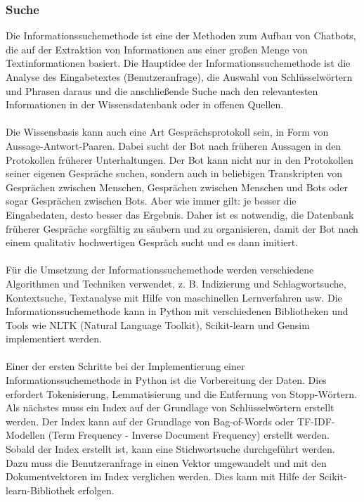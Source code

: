 \subsubsection{Suche}
Die Informationssuchemethode ist eine der Methoden zum Aufbau von Chatbots, die auf der Extraktion von Informationen aus einer großen Menge von Textinformationen basiert. 
Die Hauptidee der Informationssuchemethode ist die Analyse des Eingabetextes (Benutzeranfrage), die Auswahl von Schlüsselwörtern und Phrasen daraus und die anschließende Suche nach den relevantesten Informationen in der Wissensdatenbank oder in offenen Quellen.\\\\
Die Wissensbasis kann auch eine Art \glqq{}Gesprächsprotokoll\grqq{} sein, in Form von Aussage-Antwort-Paaren. 
Dabei sucht der Bot nach früheren Aussagen in den Protokollen früherer Unterhaltungen. 
Der Bot kann nicht nur in den Protokollen seiner eigenen Gespräche suchen, sondern auch in beliebigen Transkripten von Gesprächen zwischen Menschen, Gesprächen zwischen Menschen und Bots oder sogar Gesprächen zwischen Bots.
Aber wie immer gilt: je besser die Eingabedaten, desto besser das Ergebnis. 
Daher ist es notwendig, die Datenbank früherer Gespräche sorgfältig zu säubern und zu organisieren, damit der Bot nach einem qualitativ hochwertigen Gespräch sucht und es dann imitiert.\\\\
Für die Umsetzung der Informationssuchemethode werden verschiedene Algorithmen und Techniken verwendet, z. B. Indizierung und Schlagwortsuche, Kontextsuche, Textanalyse mit Hilfe von maschinellen Lernverfahren usw. 
Die Informationssuchemethode kann in Python mit verschiedenen Bibliotheken und Tools wie NLTK (Natural Language Toolkit), Scikit-learn und Gensim implementiert werden.\\\\
Einer der ersten Schritte bei der Implementierung einer Informationssuchemethode in Python ist die Vorbereitung der Daten. 
Dies erfordert Tokenisierung, Lemmatisierung und die Entfernung von Stopp-Wörtern. 
Als nächstes muss ein Index auf der Grundlage von Schlüsselwörtern erstellt werden. 
Der Index kann auf der Grundlage von Bag-of-Words oder TF-IDF-Modellen (Term Frequency - Inverse Document Frequency) erstellt werden. 
Sobald der Index erstellt ist, kann eine Stichwortsuche durchgeführt werden. 
Dazu muss die Benutzeranfrage in einen Vektor umgewandelt und mit den Dokumentvektoren im Index verglichen werden. 
Dies kann mit Hilfe der Scikit-learn-Bibliothek erfolgen. 
